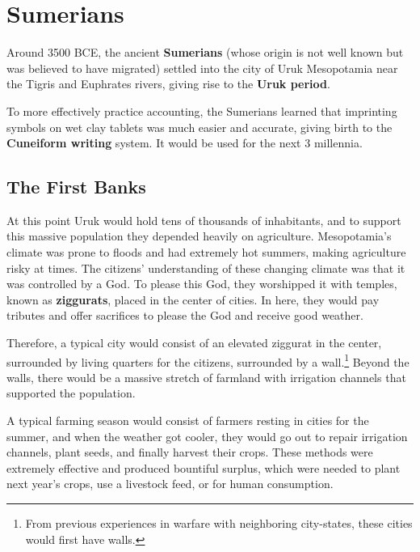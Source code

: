 \documentclass{article}
\begin{document}
\section{Sumerians}

  Around 3500 BCE, the ancient \textbf{Sumerians} (whose origin is not well known but was believed to have migrated) settled into the city of Uruk Mesopotamia near the Tigris and Euphrates rivers, giving rise to the \textbf{Uruk period}. 

  \begin{finance}[Writing]
    To more effectively practice accounting, the Sumerians learned that imprinting symbols on wet clay tablets was much easier and accurate, giving birth to the \textbf{Cuneiform writing} system. It would be used for the next 3 millennia. 
  \end{finance}

  \subsection{The First Banks}

    \begin{religion}
      At this point Uruk would hold tens of thousands of inhabitants, and to support this massive population they depended heavily on agriculture. Mesopotamia's climate was prone to floods and had extremely hot summers, making agriculture risky at times. The citizens' understanding of these changing climate was that it was controlled by a God. To please this God, they worshipped it with temples, known as \textbf{ziggurats}, placed in the center of cities. In here, they would pay tributes and offer sacrifices to please the God and receive good weather. 
    \end{religion}
    
    Therefore, a typical city would consist of an elevated ziggurat in the center, surrounded by living quarters for the citizens, surrounded by a wall.\footnote{From previous experiences in warfare with neighboring city-states, these cities would first have walls. } Beyond the walls, there would be a massive stretch of farmland with irrigation channels that supported the population.

    A typical farming season would consist of farmers resting in cities for the summer, and when the weather got cooler, they would go out to repair irrigation channels, plant seeds, and finally harvest their crops. These methods were extremely effective and produced bountiful surplus, which were needed to plant next year's crops, use a livestock feed, or for human consumption. 
\end{document}
